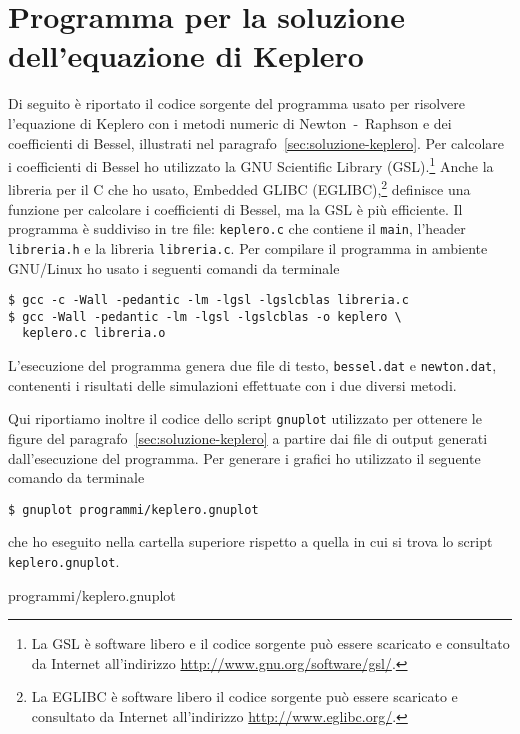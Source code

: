 \chapter{Programma per la soluzione dell'equazione di Keplero}
\label{cha:soluzione-keplero}

Di seguito è riportato il codice sorgente del programma usato per risolvere
l'equazione di Keplero con i metodi numeric di Newton~-~Raphson e dei
coefficienti di Bessel, illustrati nel
paragrafo~\ref{sec:soluzione-keplero}. Per calcolare i coefficienti di Bessel ho
utilizzato la GNU Scientific Library (GSL).\footnote{La GSL è software libero e
  il codice sorgente può essere scaricato e consultato da Internet all'indirizzo
  \url{http://www.gnu.org/software/gsl/}.} Anche la libreria per il C che ho
usato, Embedded GLIBC (EGLIBC),\footnote{La EGLIBC è software libero il codice
  sorgente può essere scaricato e consultato da Internet all'indirizzo
  \url{http://www.eglibc.org/}.} definisce una funzione per calcolare i
coefficienti di Bessel, ma la GSL è più efficiente. Il programma è suddiviso in
tre file: \verb|keplero.c| che contiene il \verb|main|, l'header
\verb|libreria.h| e la libreria \verb|libreria.c|. Per compilare il programma in
ambiente GNU/Linux ho usato i seguenti comandi da terminale
\begin{verbatim}
$ gcc -c -Wall -pedantic -lm -lgsl -lgslcblas libreria.c
$ gcc -Wall -pedantic -lm -lgsl -lgslcblas -o keplero \
  keplero.c libreria.o
\end{verbatim}
L'esecuzione del programma genera due file di testo, \verb|bessel.dat| e
\verb|newton.dat|, contenenti i risultati delle simulazioni effettuate con i due
diversi metodi.
% 
% 
% 

Qui riportiamo inoltre il codice dello script \verb|gnuplot| utilizzato per
ottenere le figure del paragrafo~\ref{sec:soluzione-keplero} a partire dai file
di output generati dall'esecuzione del programma. Per generare i grafici ho
utilizzato il seguente comando da terminale
\begin{verbatim}
$ gnuplot programmi/keplero.gnuplot
\end{verbatim}
che ho eseguito nella cartella superiore rispetto a quella in cui si trova lo
script \verb|keplero.gnuplot|.

{programmi/keplero.gnuplot}

